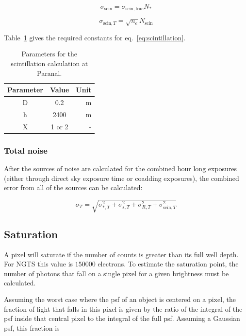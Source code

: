\documentclass[11pt,a4paper]{report}
\begin{document}
\[
    \sigma_{\mathrm{scin}} = \sigma_{\mathrm{scin},\mathrm{frac}} N_{\ast}
    \]

\[
    \sigma_{\mathrm{scin},T} = \sqrt{n_e} N_{\mathrm{scin}} 
\]

Table~\ref{tab:scintillationparams} gives the required constants for
eq.~\ref{eq:scintillation}.


\begin{table}
    \centering
    \begin{tabular}{ccr}
        \toprule
        Parameter & Value & Unit \\
        \midrule
        D & 0.2 & m \\
        h & 2400 & m \\
        X & 1 or 2 & - \\
        \bottomrule
    \end{tabular}
    \caption{Parameters for the scintillation calculation at Paranal.}
    \label{tab:scintillationparams}
\end{table}


\subsubsection{Total noise}

After the sources of noise are calculated for the combined hour long 
exposures (either through direct sky exposure time or coadding 
exposures), the combined error from all of the sources can be
calculated:

\[
    \sigma_T = \sqrt{\sigma_{\ast,T}^2 + \sigma_{s,T}^2 + \sigma_{R,T}^2 +
    \sigma_{\mathrm{scin},T}^2}
    \]





\subsection{Saturation}

A pixel will saturate if the number of counts is greater than its 
full well depth. For NGTS this value is $150000$ electrons. To 
estimate the saturation point, the number of photons that fall on 
a single pixel for a given brightness must be calculated. 

Assuming the worst case where the psf of an object is centered on 
a pixel, the fraction of light that falls in this pixel is given 
by the ratio of the integral of the psf inside that central pixel to
the integral of the full psf. Assuming a Gaussian psf, this fraction is
\end{document}

